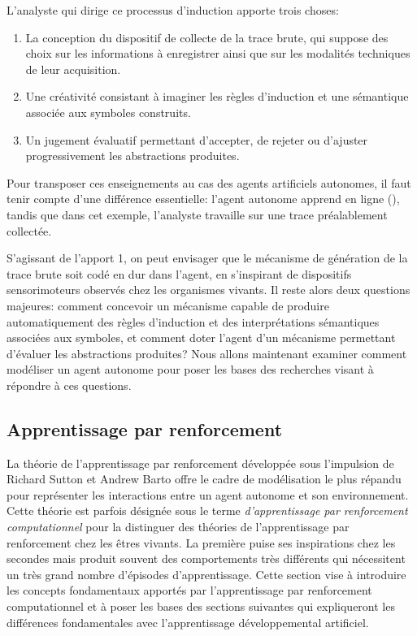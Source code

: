 L'analyste qui dirige ce processus d'induction apporte trois choses:

\begin{enumerate}
	\item La conception du dispositif de collecte de la trace brute, qui suppose des choix sur les informations à enregistrer ainsi que sur les modalités techniques de leur acquisition.
	\item Une créativité consistant à imaginer les règles d'induction et une sémantique associée aux symboles construits.
	\item Un jugement évaluatif permettant d'accepter, de rejeter ou d'ajuster progressivement les abstractions produites.
\end{enumerate}

Pour transposer ces  enseignements au cas des agents artificiels autonomes, il faut tenir compte d'une différence essentielle: l’agent autonome apprend en ligne (), tandis que dans cet exemple, l'analyste travaille sur une trace préalablement collectée.

S'agissant de l'apport 1, on peut envisager que le mécanisme de génération de la trace brute soit codé en dur dans l'agent, en s’inspirant de dispositifs sensorimoteurs observés chez les organismes vivants.
Il reste alors deux questions majeures: comment concevoir un mécanisme capable de produire automatiquement des règles d'induction et des interprétations sémantiques associées aux symboles, et comment doter l'agent d'un mécanisme permettant d'évaluer les abstractions produites?
Nous allons maintenant examiner comment modéliser un agent autonome pour poser les bases des recherches visant à répondre à ces questions.

\subsection{Apprentissage par renforcement}
\label{sec:rl}

\noindent
La théorie de l'apprentissage par renforcement développée sous l'impulsion de Richard Sutton et Andrew Barto offre le cadre de modélisation le plus répandu pour représenter les interactions entre un agent autonome et son environnement.  
Cette théorie est parfois désignée sous le terme \emph{d'apprentissage par renforcement computationnel} pour la distinguer des théories de l'apprentissage par renforcement chez les êtres vivants.  
La première puise ses inspirations chez les secondes mais produit souvent des comportements très différents qui nécessitent un très grand nombre d'épisodes d'apprentissage.
Cette section vise à introduire les concepts fondamentaux apportés par l'apprentissage par renforcement computationnel et à poser les bases des sections suivantes qui expliqueront les différences fondamentales avec l'apprentissage développemental artificiel.

